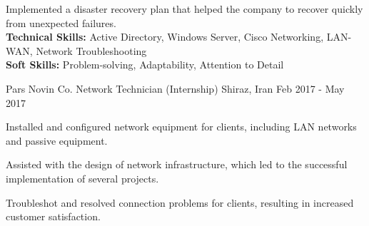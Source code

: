 \begin{cventries}
{\begin{cvitems}
        \item {Implemented a disaster recovery plan that helped the company to recover quickly from unexpected failures.
        \\\textbf{Technical Skills:} Active Directory, Windows Server, Cisco Networking, LAN-WAN, Network Troubleshooting
        \\\textbf{Soft Skills:} Problem-solving, Adaptability, Attention to Detail}%
      \end{cvitems}%
    }%
  \cventry
    {Pars Novin Co.} %
    {Network Technician (Internship)} %
    {Shiraz, Iran} %
    {Feb 2017 - May 2017} %
    {
      \begin{cvitems} %
        \item {Installed and configured network equipment for clients, including LAN networks and passive equipment.}
        \item {Assisted with the design of network infrastructure, which led to the successful implementation of several projects.}
        \item {Troubleshot and resolved connection problems for clients, resulting in increased customer satisfaction.}%
      \end{cvitems}
    }
\end{cventries}
